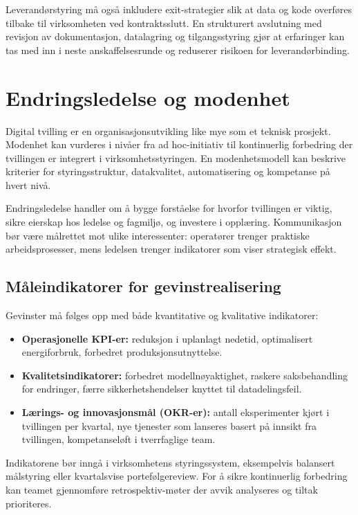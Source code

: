 Leverandørstyring må også inkludere exit-strategier slik at data og kode overføres tilbake til virksomheten ved kontraktsslutt. En
strukturert avslutning med revisjon av dokumentasjon, datalagring og tilgangsstyring gjør at erfaringer kan tas med inn i neste
anskaffelsesrunde og reduserer risikoen for leverandørbinding.

\section{Endringsledelse og modenhet}
Digital tvilling er en organisasjonsutvikling like mye som et teknisk prosjekt. Modenhet kan vurderes i nivåer fra ad hoc-initiativ til kontinuerlig forbedring der tvillingen er integrert i virksomhetsstyringen. En modenhetsmodell kan beskrive kriterier for styringsstruktur, datakvalitet, automatisering og kompetanse på hvert nivå.

Endringsledelse handler om å bygge forståelse for hvorfor tvillingen er viktig, sikre eierskap hos ledelse og fagmiljø, og investere i opplæring. Kommunikasjon bør være målrettet mot ulike interessenter: operatører trenger praktiske arbeidsprosesser, mens ledelsen trenger indikatorer som viser strategisk effekt.

\subsection*{Måleindikatorer for gevinstrealisering}
Gevinster må følges opp med både kvantitative og kvalitative indikatorer:
\begin{itemize}
    \item \textbf{Operasjonelle KPI-er:} reduksjon i uplanlagt nedetid, optimalisert energiforbruk, forbedret produksjonsutnyttelse.
    \item \textbf{Kvalitetsindikatorer:} forbedret modellnøyaktighet, raskere saksbehandling for endringer, færre sikkerhetshendelser knyttet til datadelingsfeil.
    \item \textbf{Lærings- og innovasjonsmål (OKR-er):} antall eksperimenter kjørt i tvillingen per kvartal, nye tjenester som lanseres basert på innsikt fra tvillingen, kompetanseløft i tverrfaglige team.
\end{itemize}
Indikatorene bør inngå i virksomhetens styringssystem, eksempelvis balansert målstyring eller kvartalsvise portefølgereview. For å sikre kontinuerlig forbedring kan teamet gjennomføre retrospektiv-møter der avvik analyseres og tiltak prioriteres.

